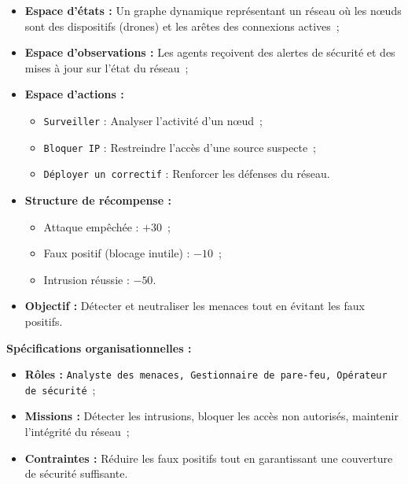 \begin{itemize}
    \item \textbf{Espace d'états :} Un graphe dynamique représentant un réseau où les nœuds sont des dispositifs (drones) et les arêtes des connexions actives~;
    \item \textbf{Espace d'observations :} Les agents reçoivent des alertes de sécurité et des mises à jour sur l'état du réseau~;
    \item \textbf{Espace d'actions :}
          \begin{itemize}
              \item \texttt{Surveiller} : Analyser l'activité d'un nœud~;
              \item \texttt{Bloquer IP} : Restreindre l'accès d'une source suspecte~;
              \item \texttt{Déployer un correctif} : Renforcer les défenses du réseau.
          \end{itemize}
    \item \textbf{Structure de récompense :}
          \begin{itemize}
              \item Attaque empêchée : $+30$~;
              \item Faux positif (blocage inutile) : $-10$~;
              \item Intrusion réussie : $-50$.
          \end{itemize}
    \item \textbf{Objectif :} Détecter et neutraliser les menaces tout en évitant les faux positifs.
\end{itemize}

\textbf{Spécifications organisationnelles :}
\begin{itemize}
    \item \textbf{Rôles :} \texttt{Analyste des menaces, Gestionnaire de pare-feu, Opérateur de sécurité}~;
    \item \textbf{Missions :} Détecter les intrusions, bloquer les accès non autorisés, maintenir l'intégrité du réseau~;
    \item \textbf{Contraintes :} Réduire les faux positifs tout en garantissant une couverture de sécurité suffisante.
\end{itemize}

